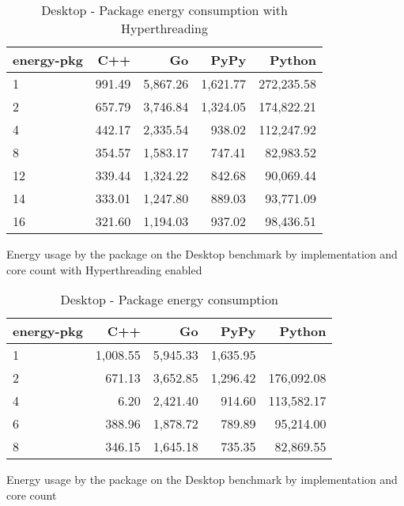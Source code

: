 \begin{table}[H]
 \centering
    \begin{tabular}{lrrrr}
    \hline
    energy-pkg & C++ & Go & PyPy & Python \\
    \hline
    1 & 991.49 & 5,867.26 & 1,621.77 & 272,235.58 \\
    2 & 657.79 & 3,746.84 & 1,324.05 & 174,822.21 \\
    4 & 442.17 & 2,335.54 & 938.02 & 112,247.92 \\
    8 & 354.57 & 1,583.17 & 747.41 & 82,983.52 \\
    12 & 339.44 & 1,324.22 & 842.68 & 90,069.44 \\
    14 & 333.01 & 1,247.80 & 889.03 & 93,771.09 \\
    16 & 321.60 & 1,194.03 & 937.02 & 98,436.51 \\
    \hline
    \end{tabular}
\caption{Desktop - Package energy consumption with Hyperthreading}{Energy usage by the package on the Desktop benchmark by implementation and core count with Hyperthreading enabled}
\label{tab:desktop-energy-pkg-hyperthreading}
\end{table}

\begin{table}[H]
    \centering
    \begin{tabular}{lrrrr}
        \hline
        energy-pkg     & C++                 & Go          & PyPy       & Python              \\
        \hline
        1              & 1,008.55            & 5,945.33    & 1,635.95   &                    \\
        2              & 671.13              & 3,652.85    & 1,296.42   & 176,092.08         \\
        4              & 6.20                & 2,421.40    & 914.60     & 113,582.17         \\
        6              & 388.96              & 1,878.72    & 789.89     & 95,214.00          \\
        8	           & 346.15              & 1,645.18    & 735.35     & 82,869.55          \\
        \hline
    \end{tabular}
\caption{Desktop - Package energy consumption}{Energy usage by the package on the Desktop benchmark by implementation and core count}
\label{tab:desktop-energy-pkg}
\end{table}

